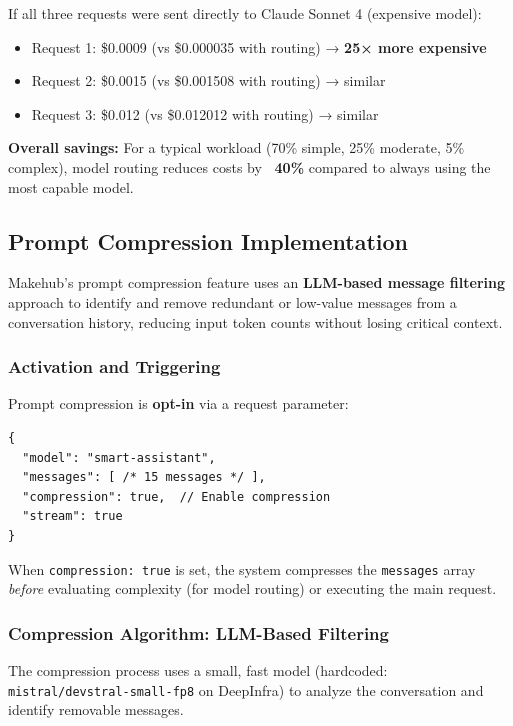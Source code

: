 \documentclass[english]{article}
\begin{document}
If all three requests were sent directly to Claude Sonnet 4 (expensive model):
\begin{itemize}
    \item Request 1: \$0.0009 (vs \$0.000035 with routing) → \textbf{25× more expensive}
    \item Request 2: \$0.0015 (vs \$0.001508 with routing) → similar
    \item Request 3: \$0.012 (vs \$0.012012 with routing) → similar
\end{itemize}

\textbf{Overall savings:} For a typical workload (70\% simple, 25\% moderate, 5\% complex), model routing reduces costs by \textbf{~40\%} compared to always using the most capable model.

\subsection{Prompt Compression Implementation}

Makehub's prompt compression feature uses an \textbf{LLM-based message filtering} approach to identify and remove redundant or low-value messages from a conversation history, reducing input token counts without losing critical context.

\subsubsection{Activation and Triggering}

Prompt compression is \textbf{opt-in} via a request parameter:

\begin{listing}[H]
\begin{verbatim}
{
  "model": "smart-assistant",
  "messages": [ /* 15 messages */ ],
  "compression": true,  // Enable compression
  "stream": true
}
\end{verbatim}
\caption{Request with compression enabled}
\end{listing}

When \texttt{compression: true} is set, the system compresses the \texttt{messages} array \emph{before} evaluating complexity (for model routing) or executing the main request.

\subsubsection{Compression Algorithm: LLM-Based Filtering}

The compression process uses a small, fast model (hardcoded: \texttt{mistral/devstral-small-fp8} on DeepInfra) to analyze the conversation and identify removable messages.
\end{document}
